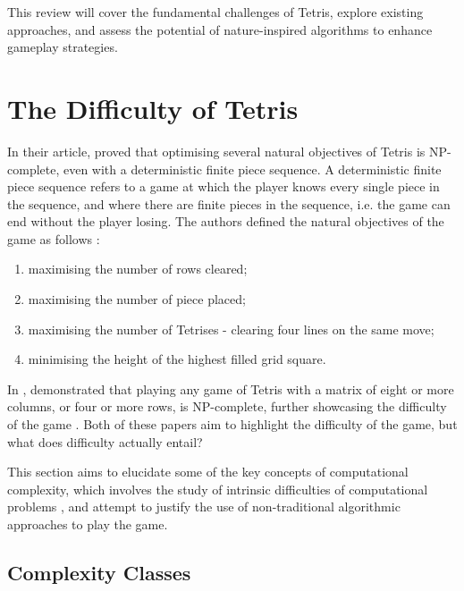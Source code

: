\documentclass[a4paper, 12pt]{extreport}
\begin{document}
	This review will cover the fundamental challenges of Tetris, explore existing approaches, and assess the potential of nature-inspired algorithms to enhance gameplay strategies.	
	
	\section{The Difficulty of Tetris} \label{sec:diff-of-tetris}
	
	In their article, \citeauthor{tetris-is-hard-even-to-approx} \cite{tetris-is-hard-even-to-approx} proved that optimising several natural objectives of Tetris is NP-complete, even with a deterministic finite piece sequence. A deterministic finite piece sequence refers to a game at which the player knows every single piece in the sequence, and where there are finite pieces in the sequence, i.e. the game can end without the player losing. The authors defined the natural objectives of the game as follows \cite{tetris-is-hard-even-to-approx}:
	
	\begin{enumerate}
		\item maximising the number of rows cleared;
		\item maximising the number of piece placed;
		\item maximising the number of Tetrises - clearing four lines on the same move;
		\item minimising the height of the highest filled grid square.
	\end{enumerate}
	
	In \citeyear{tetris-o1-np-hard}, \citeauthor{tetris-o1-np-hard} \cite{tetris-o1-np-hard} demonstrated that playing any game of Tetris with a matrix of eight or more columns, or four or more rows, is NP-complete, further showcasing the difficulty of the game . Both of these papers aim to highlight the difficulty of the game, but what does difficulty actually entail?
	
	This section aims to elucidate some of the key concepts of computational complexity, which involves the study of intrinsic difficulties of computational problems \cite{cc:conceptual-perspective}, and attempt to justify the use of non-traditional algorithmic approaches to play the game.
	
	\subsection{Complexity Classes}\label{subsec:compclass}
	
\end{document}
